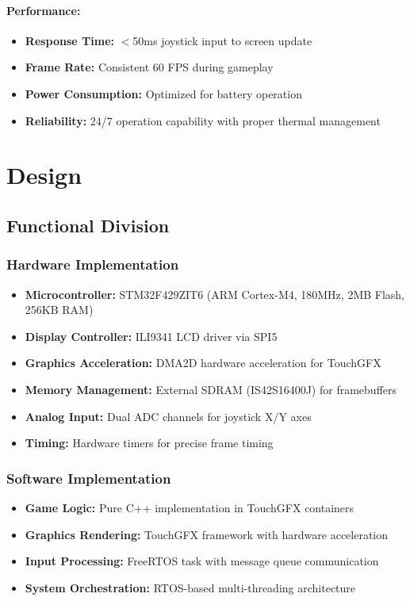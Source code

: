\documentclass[12pt,a4paper]{article}
\begin{document}
\paragraph{Performance:}
\begin{itemize}[leftmargin=*]
    \item \textbf{Response Time:} $<$50ms joystick input to screen update
    \item \textbf{Frame Rate:} Consistent 60 FPS during gameplay
    \item \textbf{Power Consumption:} Optimized for battery operation
    \item \textbf{Reliability:} 24/7 operation capability with proper thermal management
\end{itemize}

\newpage

\section{Design}

\subsection{Functional Division}

\subsubsection{Hardware Implementation}
\begin{itemize}[leftmargin=*]
    \item \textbf{Microcontroller:} STM32F429ZIT6 (ARM Cortex-M4, 180MHz, 2MB Flash, 256KB RAM)
    \item \textbf{Display Controller:} ILI9341 LCD driver via SPI5
    \item \textbf{Graphics Acceleration:} DMA2D hardware acceleration for TouchGFX
    \item \textbf{Memory Management:} External SDRAM (IS42S16400J) for framebuffers
    \item \textbf{Analog Input:} Dual ADC channels for joystick X/Y axes
    \item \textbf{Timing:} Hardware timers for precise frame timing
\end{itemize}

\subsubsection{Software Implementation}
\begin{itemize}[leftmargin=*]
    \item \textbf{Game Logic:} Pure C++ implementation in TouchGFX containers
    \item \textbf{Graphics Rendering:} TouchGFX framework with hardware acceleration
    \item \textbf{Input Processing:} FreeRTOS task with message queue communication
    \item \textbf{System Orchestration:} RTOS-based multi-threading architecture
\end{itemize}
\end{document}

